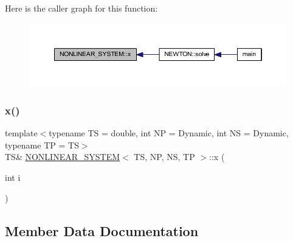 Here is the caller graph for this function\+:\nopagebreak
\begin{figure}[H]
\begin{center}
\leavevmode
\includegraphics[width=350pt]{class_n_o_n_l_i_n_e_a_r___s_y_s_t_e_m_a74d8eaa53624eae38a6f2e6b5bdd4381_icgraph}
\end{center}
\end{figure}
\mbox{\label{class_n_o_n_l_i_n_e_a_r___s_y_s_t_e_m_aabd6041ce7d6aaad8ce55e03c2efde1e}} 
\subsubsection{\texorpdfstring{x()}{x()}\hspace{0.1cm}{\footnotesize\ttfamily [2/2]}}
{\footnotesize\ttfamily template$<$typename TS = double, int NP = Dynamic, int NS = Dynamic, typename TP = TS$>$ \\
TS\& \mbox{\hyperlink{class_n_o_n_l_i_n_e_a_r___s_y_s_t_e_m}{N\+O\+N\+L\+I\+N\+E\+A\+R\+\_\+\+S\+Y\+S\+T\+EM}}$<$ TS, NP, NS, TP $>$\+::x (\begin{DoxyParamCaption}\item[{int}]{i }\end{DoxyParamCaption})\hspace{0.3cm}{\ttfamily [inline]}}



\subsection{Member Data Documentation}
\mbox{\label{class_n_o_n_l_i_n_e_a_r___s_y_s_t_e_m_aee48110f36d056d217437af5e7cc5447}} 
